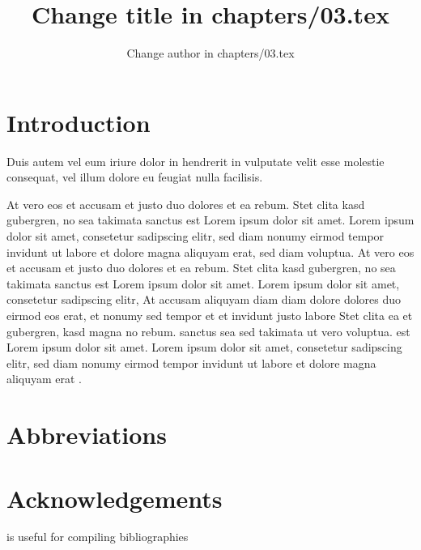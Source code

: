 \documentclass[output=paper]{langscibook}
\author{Change author in chapters/03.tex\affiliation{???}}
\title{Change title in chapters/03.tex}
\begin{document}
\maketitle

\section{Introduction}
Duis autem vel eum iriure dolor in hendrerit in vulputate velit esse molestie consequat, vel illum dolore eu feugiat nulla facilisis. 

At vero eos et accusam et justo duo dolores et ea rebum. Stet clita kasd gubergren, no sea takimata sanctus est Lorem ipsum dolor sit amet. Lorem ipsum dolor sit amet, consetetur sadipscing elitr, sed diam nonumy eirmod tempor invidunt ut labore et dolore magna aliquyam erat, sed diam voluptua. At vero eos et accusam et justo duo dolores et ea rebum. Stet clita kasd gubergren, no sea takimata sanctus est Lorem ipsum dolor sit amet. Lorem ipsum dolor sit amet, consetetur sadipscing elitr, At accusam aliquyam diam diam dolore dolores duo eirmod eos erat, et nonumy sed tempor et et invidunt justo labore Stet clita ea et gubergren, kasd magna no rebum. sanctus sea sed takimata ut vero voluptua. est Lorem ipsum dolor sit amet. Lorem ipsum dolor sit amet, consetetur sadipscing elitr, sed diam nonumy eirmod tempor invidunt ut labore et dolore magna aliquyam erat 
 .


\section*{Abbreviations}
\section*{Acknowledgements}
\citet{Nordhoff2018} is useful for compiling bibliographies

\printbibliography[heading=subbibliography,notkeyword=this] 
\end{document}
